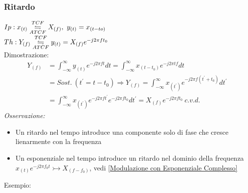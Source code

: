         \subsubsection{Ritardo}\label{Ritardo}
            $Ip: x_{(t)} \overunderset{TCF}{ATCF}{\leftrightharpoons} X_{(f)},\ y_{(t)} = x_{(t-to)}$\\        
            $Th: Y_{(f)} \overunderset{TCF}{ATCF}{\leftrightharpoons} y_{(t)} = X_{(f)}e^{-j2\pi ft_0}$\\ 
            Dimostrazione:
            \begin{align}
                Y_{(f)} & = \int_{-\infty}^{\infty} y_{(t)} e^{-j2\pi ft} dt = \int_{-\infty}^{\infty} x_{(t-t_0)} e^{-j2\pi tf} dt \nonumber \\
                        & =Sost.\ (t^\prime = t-t_0) \Rightarrow  Y_{(f)} = \int_{-\infty}^{\infty} x_{(t^\prime)} e^{-j2\pi f(t^\prime+t_0)} dt^\prime \nonumber \\
                        & =\int_{-\infty}^{\infty} x_{(t^\prime)} e^{-j2\pi ft^\prime}e^{-j2\pi ft_0} dt^\prime= X_{(f)}e^{-j2\pi ft_0}\ c.v.d.  \nonumber
            \end{align}
            {\em Osservazione:}
                \begin{itemize}
                    \item Un ritardo nel tempo introduce una componente solo di fase che cresce lienarmente con la frequenza
                    \item Un esponenziale nel tempo introduce un ritardo nel dominio della frequenza $x_{(t)}e^{-j2\pi f_0t} \rightarrowtail X_{(f-f_0)}$, vedi \ref{Modulazione con Esponenziale Complesso}
                \end{itemize}
            Esempio:\\
